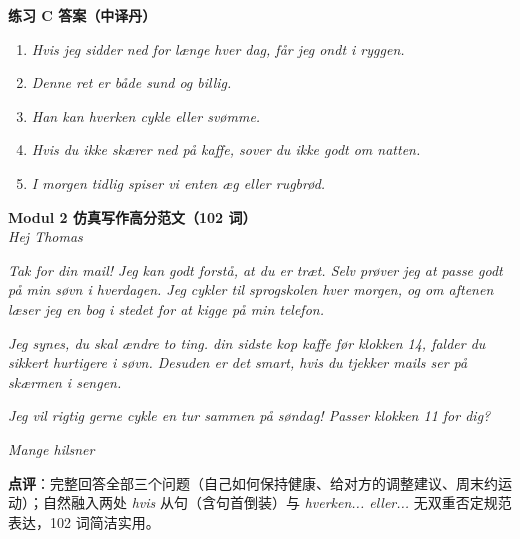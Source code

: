 \begin{answerbox}
\textbf{练习 C 答案（中译丹）}
\begin{enumerate}
  \item \textit{Hvis jeg sidder ned for længe hver dag, får jeg ondt i ryggen.}
  \item \textit{Denne ret er både sund og billig.}
  \item \textit{Han kan hverken cykle eller svømme.}
  \item \textit{Hvis du ikke skærer ned på kaffe, sover du ikke godt om natten.}
  \item \textit{I morgen tidlig spiser vi enten æg eller rugbrød.}
\end{enumerate}

\textbf{Modul 2 仿真写作高分范文（102 词）}\\
\textit{Hej Thomas}

\textit{Tak for din mail! Jeg kan godt forstå, at du er træt. Selv prøver jeg at passe godt på min søvn i hverdagen. Jeg cykler til sprogskolen hver morgen, og om aftenen læser jeg en bog i stedet for at kigge på min telefon.}

\textit{Jeg synes, du skal ændre to ting.  din sidste kop kaffe før klokken 14, falder du sikkert hurtigere i søvn. Desuden er det smart, hvis du  tjekker mails  ser på skærmen i sengen.}

\textit{Jeg vil rigtig gerne cykle en tur sammen på søndag! Passer klokken 11 for dig?}

\textit{Mange hilsner\\
}

\small\textbf{点评}：完整回答全部三个问题（自己如何保持健康、给对方的调整建议、周末约运动）；自然融入两处 \textit{hvis} 从句（含句首倒装）与 \textit{hverken... eller...} 无双重否定规范表达，102 词简洁实用。
\end{answerbox}
